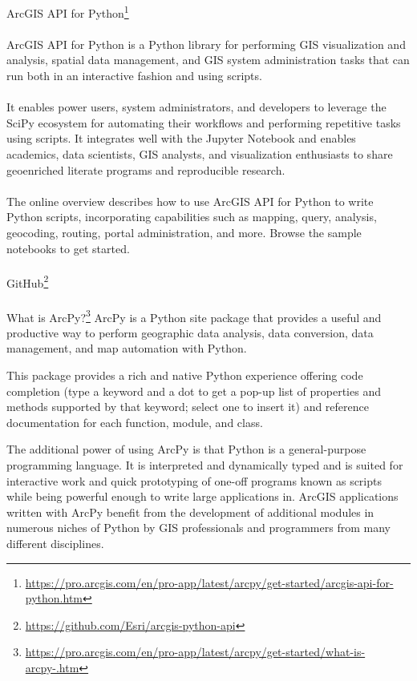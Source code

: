 ArcGIS API for Python\footnote{\url{https://pro.arcgis.com/en/pro-app/latest/arcpy/get-started/arcgis-api-for-python.htm}}
\\\\
ArcGIS API for Python is a Python library for performing GIS visualization and analysis, spatial data management, and GIS system administration tasks that can run both in an interactive fashion and using scripts.
\\\\
It enables power users, system administrators, and developers to leverage the SciPy ecosystem for automating their workflows and performing repetitive tasks using scripts. It integrates well with the Jupyter Notebook and enables academics, data scientists, GIS analysts, and visualization enthusiasts to share geoenriched literate programs and reproducible research.
\\\\
The online overview describes how to use ArcGIS API for Python to write Python scripts, incorporating capabilities such as mapping, query, analysis, geocoding, routing, portal administration, and more. Browse the sample notebooks to get started.
\\\\
GitHub\footnote{\url{https://github.com/Esri/arcgis-python-api}}
\\\\
What is ArcPy?\footnote{\url{https://pro.arcgis.com/en/pro-app/latest/arcpy/get-started/what-is-arcpy-.htm}}
ArcPy is a Python site package that provides a useful and productive way to perform geographic data analysis, data conversion, data management, and map automation with Python.

This package provides a rich and native Python experience offering code completion (type a keyword and a dot to get a pop-up list of properties and methods supported by that keyword; select one to insert it) and reference documentation for each function, module, and class.

The additional power of using ArcPy is that Python is a general-purpose programming language. It is interpreted and dynamically typed and is suited for interactive work and quick prototyping of one-off programs known as scripts while being powerful enough to write large applications in. ArcGIS applications written with ArcPy benefit from the development of additional modules in numerous niches of Python by GIS professionals and programmers from many different disciplines.

